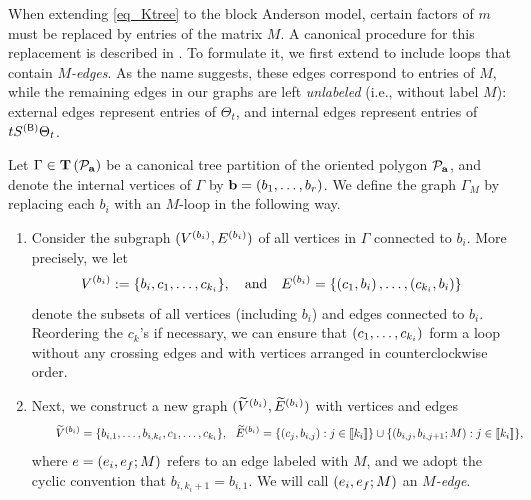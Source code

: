 When extending \eqref{eq_Ktree} to the block Anderson model, certain factors of $m$ must be replaced by entries of the matrix $M$. A canonical procedure for this replacement is described in \cite[Section 4]{RBSO1D}. To formulate it, we first extend  to include loops that contain \emph{$M$-edges}. As the name suggests, these edges correspond to entries of $M$, while the remaining edges in our graphs are left \emph{unlabeled} (i.e., without label $M$): external edges represent entries of $\Theta_t$, and internal edges represent entries of $tS^{({\mathsf{B}})}\Theta_t$.



\begin{definition}\label{m-loop-tsp}
Let $\Gamma \in \operatorname{{\mathbf T}}\left({\mathcal{P}_{{\mathbf{a}}}}\right)$ be a canonical tree partition of the oriented polygon $\mathcal{P}_{{\mathbf{a}}}$, and denote the internal vertices of $\Gamma$ by $\mathbf b = \left({b_1, \ldots, b_r}\right)$. We define the graph {$\Gamma_{M}$} by replacing each $b_i$ with an $M$-loop in the following way.
\begin{enumerate}
\item Consider the subgraph $(V^{\left({b_i}\right)}, E^{\left({b_i}\right)})$ of all vertices in $\Gamma$ connected to $b_i$. More precisely, we let
      \begin{equation}\label{b_i-subgraph}
        V^{\left({b_i}\right)} := \{b_i,c_1, \ldots, c_{k_i}\},
        \quad \text{and}\quad E^{\left({b_i}\right)} = \{\left({c_1, b_i}\right), \ldots, \left({c_{k_i}, b_i}\right)\}
      \end{equation}
      denote the subsets of all vertices (including $b_i$) and edges connected to $b_i$. Reordering the $c_k$'s if necessary, we can ensure that $\left({c_1, \ldots, c_{k_i}}\right)$ form a loop without any crossing edges and with vertices arranged in counterclockwise order.
      
\item Next, we construct a new graph $(\widetilde{V}^{\left({b_i}\right)}, \widetilde{E}^{\left({b_i}\right)})$ with vertices and edges
      \begin{align}\label{eq:M-loopexample}
   \qquad      \widetilde{V}^{\left({b_i}\right)} &= \{b_{i,1}, \ldots, b_{i,k_i}, c_1, \ldots, c_{k_i}\},\ \
           \widetilde{E}^{\left({b_i}\right)}
     =\{\left({c_j, b_{i,j}}\right) :  j \in \llbracket{k_i}\rrbracket\} \cup \{\left({b_{i,j}, b_{i,j+1}; M}\right): j \in \llbracket{k_i}\rrbracket\}, 
      \end{align}
   where $e = \left({e_i, e_f; M}\right)$ refers to an edge labeled with $M$, and we adopt the cyclic convention that $b_{i,k_i+1}=b_{i,1}$. We will call $\left({e_i, e_f; M}\right)$ an \emph{$M$-edge}. %
      

\end{enumerate}
\end{definition}
